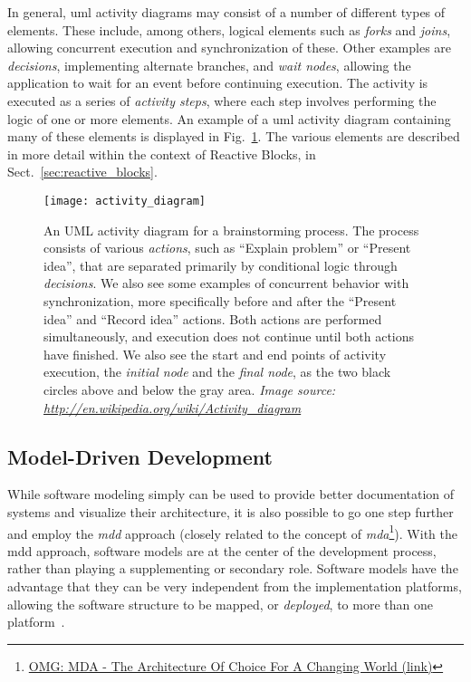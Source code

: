 \noindent
In general, \gls{uml} activity diagrams may consist of a number of different types of elements. These include, among others, logical elements such as \emph{forks} and \emph{joins}, allowing concurrent execution and synchronization of these. Other examples are \emph{decisions}, implementing alternate branches, and \emph{wait nodes}, allowing the application to wait for an event before continuing execution.  The activity is executed as a series of \emph{activity steps}, where each step involves performing the logic of one or more elements. An example of a \gls{uml} activity diagram containing many of these elements is displayed in Fig.~\ref{fig:activity_diagram}. The various elements are described in more detail within the context of Reactive Blocks, in Sect.~\ref{sec:reactive_blocks}.

\begin{figure}[htp]
	\centering
	\texttt{[image: activity\_diagram]}
	\caption[UML Activity Diagram]{An UML activity diagram for a brainstorming process. The process consists of various \emph{actions}, such as ``Explain problem'' or ``Present idea'', that are separated primarily by conditional logic through \emph{decisions}. We also see some examples of concurrent behavior with synchronization, more specifically before and after the ``Present idea'' and ``Record idea'' actions. Both actions are performed simultaneously, and execution does not continue until both actions have finished. We also see the start and end points of activity execution, the \emph{initial node} and the \emph{final node}, as the two black circles above and below the gray area. \emph{Image source: \url{http://en.wikipedia.org/wiki/Activity_diagram}}}
	\label{fig:activity_diagram}
\end{figure}

\subsection{Model-Driven Development}
\label{sec:model_driven_development}
While software modeling simply can be used to provide better documentation of systems and visualize their architecture, it is also possible to go one step further and employ the \emph{\gls{mdd}} approach (closely related to the concept of \emph{\gls{mda}}\footnote{\href{http://www.omg.org/mda/}{OMG: MDA - The Architecture Of Choice For A Changing World (link)}}). With the \gls{mdd} approach, software models are at the center of the development process, rather than playing a supplementing or secondary role. Software models have the advantage that they can be very independent from the implementation platforms, allowing the software structure to be mapped, or \emph{deployed}, to more than one platform~\cite{braek:itut_methodologies, selic:model_driven_development}.

